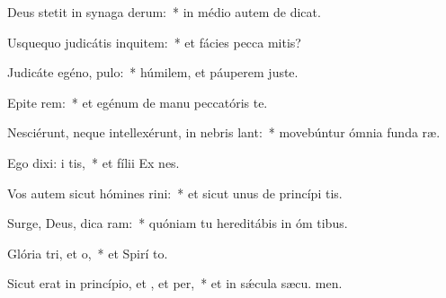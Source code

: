 \item Deus stetit in synaga derum:~* in médio autem de dicat.
\item Usquequo judicátis inquitem:~* et fácies pecca mitis?
\item Judicáte egéno,  pulo:~* húmilem, et páuperem juste.
\item Epite rem:~* et egénum de manu peccatóris te.
\item Nesciérunt, neque intellexérunt, in nebris lant:~* movebúntur ómnia funda ræ.
\item Ego dixi: i tis,~* et fílii Ex nes.
\item Vos autem sicut hómines rini:~* et sicut unus de princípi tis.
\item Surge, Deus, dica ram:~* quóniam tu hereditábis in óm tibus.
\item Glória tri, et o,~* et Spirí to.
\item Sicut erat in princípio, et , et per,~* et in sǽcula sæcu. men.
